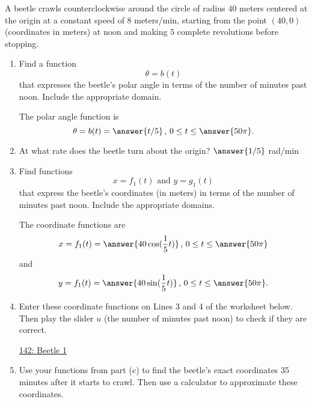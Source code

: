 \documentclass{ximera}
\begin{document}
\begin{example} \label{Edfhg]hghgdfg}
A beetle crawls counterclockwise around the circle of radius $40$ meters centered at the origin at a constant speed of $8$ meters/min, starting from the point $(40,0)$ (coordinates in meters) at noon and making $5$ complete revolutions before stopping.

\begin{enumerate}

\item Find a function
\[
    \theta = b(t)
\]
that expresses the beetle's polar angle in terms of the number of minutes past noon. Include the appropriate domain.

The polar angle function is
\[
   \theta = b(t) = \answer{t/5} \, , \, 0 \leq t \leq \answer{50\pi} .
\]

\item At what rate does the beetle turn about the origin?  $\answer{1/5}$ rad/min



\item Find functions
\[
   x = f_1(t) \text{ and } y=g_1(t)
\]
that express the beetle's coordinates (in meters)  in terms of the number of minutes past noon. Include the appropriate domains.

The coordinate functions are
\[
    x = f_1(t) = \answer{40\cos(\frac{1}{5}t)} \, , \, 0 \leq t \leq \answer{50\pi} 
\]
and 
\[
    y = f_1(t) = \answer{40\sin(\frac{1}{5}t)} \, , \, 0 \leq t \leq \answer{50\pi} .
\]

\item Enter these coordinate functions on Lines 3 and 4 of the worksheet below. Then play the slider $u$ (the number of minutes past noon) to check if they are correct.

\begin{onlineOnly}
    \begin{center}
\end{center}
\end{onlineOnly}

\href{https://www.desmos.com/calculator/pygmcbcogi}{142: Beetle 1}

\item Use your functions from part (c) to find the beetle's exact coordinates 35 minutes after it starts to crawl. Then use a calculator to approximate these coordinates. 

\end{enumerate}
\end{example}
\end{document}
